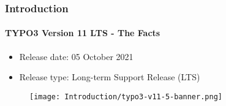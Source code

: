 %

\begin{frame}[fragile]
	\frametitle{Introduction}
	\framesubtitle{TYPO3 Version 11 LTS - The Facts}

	\begin{itemize}
		\item Release date: 05 October 2021
		\item Release type: Long-term Support Release (LTS)
	\end{itemize}

	\begin{figure}
		\texttt{[image: Introduction/typo3-v11-5-banner.png]}
	\end{figure}

\end{frame}

